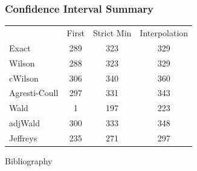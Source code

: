 \documentclass{beamer}\usepackage{knitr}
\begin{document}
\begin{frame}[fragile]
\frametitle{Confidence Interval Summary}
\begin{center}
  \begin{tabular}{lccc}
              & First & Strict Min & Interpolation \\
    Exact     & 289 & 323 & 329 \\
    Wilson    & 288 & 323 & 329 \\
    cWilson   & 306 & 340 & 360 \\
    Agresti-Coull   & 297 & 331 & 343 \\
    Wald      & 1 & 197 & 223 \\
    adjWald   & 300 & 333 & 348 \\
    Jeffreys  & 235 & 271 & 297 \\
  \end{tabular}
\end{center}
\end{frame}



\begin{frame}{Bibliography}


\end{frame}
\end{document}
